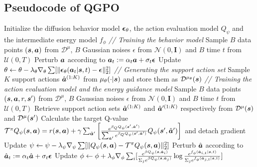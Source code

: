 \subsection{Pseudocode of QGPO}
\label{Sec:pseudocode}
\begin{algorithm}
    \caption{Q-Guided Policy Optimization (QGPO) for Offline RL}
    \label{alg:offline_rl}
    \begin{algorithmic}
        \STATE Initialize the diffusion behavior model $\bm{\epsilon}_{\theta}$, the action evaluation model $Q_\psi$ and the intermediate energy model $f_\phi$
        \STATE \small{\color{gray} \textit{// Training the behavior model}}
        \STATE Sample $B$ data points $\left({\bm{s}}, {\bm{a}}\right)$ from $\mathcal{D}^\mu$, $B$ Gaussian noises $\epsilon$ from $\mathcal{N}(0,\bm{I})$ and $B$ time $t$ from $\mathcal{U}(0, T)$
        \STATE Perturb ${\bm{a}}$ according to ${\bm{a}}_t := \alpha_t {\bm{a}} + \sigma_t \bm{\epsilon}$
        \STATE Update $\theta \leftarrow \theta - \lambda_\theta\nabla_{\theta} \sum[\| \bm{\epsilon}_\theta({\bm{a}}_t|{\bm{s}},t) - \bm{\epsilon} \|_2^2]$
        \ENDFOR
        \STATE \small{\color{gray} \textit{// Generating the support action set}}
        \STATE Sample $K$ support actions ${\hat {{\bm{a}}}}^{(1:K)}$ from $\mu_\theta(\cdot|{\bm{s}})$ and store them as $\mathcal{D}^{\mu_\theta}({\bm{s}})$
        \ENDFOR
        \STATE \small{\color{gray} \textit{// Training the action evaluation model and the energy guidance model}}
        \STATE Sample $B$ data points $\left({{\bm{s}}, {\bm{a}}, r, {\bm{s}}'}\right)$ from $\mathcal{D}^\mu$, $B$ Gaussian noises $\epsilon$ from $\mathcal{N}(0,\bm{I})$ and $B$ time $t$ from $\mathcal{U}(0, T)$
        \STATE Retrieve support action sets ${\hat {{\bm{a}}}}^{(1:K)}$ and ${\hat {{\bm{a}}}}^{\prime(1:K)}$ respectively from $\mathcal{D}^\mu({\bm{s}})$ and $\mathcal{D}^\mu({\bm{s}}')$
        \STATE Calculate the target Q-value $\mathcal{T}^\pi Q_\psi({\bm{s}}, {\bm{a}}) = r({\bm{s}}, {\bm{a}}) + \gamma\sum_{\hat{{\bm{a}}}'} \bigg[\frac{e^{\beta_Q Q_\psi({\bm{s}}',\hat{{\bm{a}}}')}}{\sum_{\hat{{\bm{a}}}'} e^{\beta_Q Q_\psi({\bm{s}}',\hat{{\bm{a}}}')}}Q_\psi({\bm{s}}',\hat{{\bm{a}}}')\bigg]$ and detach gradient
        \STATE Update $\psi \leftarrow \psi - \lambda_\psi\nabla_{\psi} \sum[\| Q_\psi({\bm{s}}, {\bm{a}}) - \mathcal{T}^\pi Q_\psi({\bm{s}}, {\bm{a}}) \|_2^2]$
        \STATE Perturb $\hat{{\bm{a}}}$ according to $\hat{{\bm{a}}}_t := \alpha_t \hat{{\bm{a}}} + \sigma_t \bm{\epsilon}$
        \STATE Update $\phi \leftarrow \phi + \lambda_\phi\nabla_{\phi} \sum_i[ \frac{e^{\beta Q_\psi({\bm{s}}, \hat {{\bm{a}}}_i)}}{\Sigma_j e^{\beta Q_\psi({\bm{s}}, \hat {{\bm{a}}}_j)}}  \log\frac{e^{f_\phi(\hat {{\bm{a}}}_{i, t}| {\bm{s}}, t)}}{\Sigma_j e^{f_\phi(\hat {{\bm{a}}}_{j, t}| {\bm{s}}, t)}} ]$
        \ENDFOR
    \end{algorithmic}
\end{algorithm}

